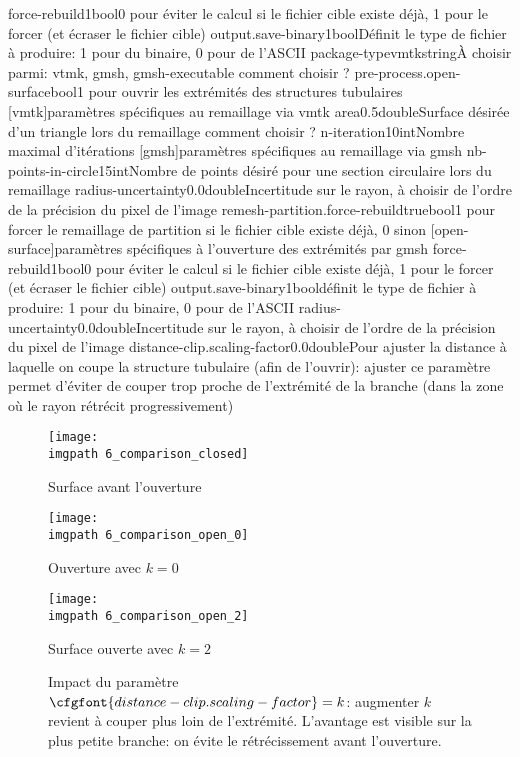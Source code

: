 \configfile
{force-rebuild}{1}{bool}{0 pour éviter le calcul si le fichier cible existe déjà, 1 pour le forcer (et écraser le fichier cible)}
{output.save-binary}{1}{bool}{Définit le type de fichier \stl à produire: 1 pour du binaire, 0 pour de l'ASCII}
{package-type}{vmtk}{string}{À choisir parmi: vtmk, gmsh, gmsh-executable \tbv comment choisir ?}
{pre-process.open-surface}{}{bool}{1 pour ouvrir les extrémités des structures tubulaires}
{[vmtk]}{paramètres spécifiques au remaillage via vmtk}{}{}
{area}{0.5}{double}{Surface désirée d'un triangle lors du remaillage \tbv comment choisir ?}
{n-iteration}{10}{int}{Nombre maximal d'itérations}
{[gmsh]}{paramètres spécifiques au remaillage via gmsh}{}{}
{nb-points-in-circle}{15}{int}{Nombre de points désiré pour une section circulaire lors du remaillage}
{radius-uncertainty}{0.0}{double}{Incertitude sur le rayon, à choisir de l'ordre de la précision du pixel de l'image}
{remesh-partition.force-rebuild}{true}{bool}{1 pour forcer le remaillage de partition si le fichier cible existe déjà, 0 sinon}
{[open-surface]}{paramètres spécifiques à l'ouverture des extrémités par gmsh}{}{} 
{force-rebuild}{1}{bool}{0 pour éviter le calcul si le fichier cible existe déjà, 1 pour le forcer (et écraser le fichier cible)}
{output.save-binary}{1}{bool}{définit le type de fichier \stl à produire: 1 pour du binaire, 0 pour de l'ASCII}
{radius-uncertainty}{0.0}{double}{Incertitude sur le rayon, à choisir de l'ordre de la précision du pixel de l'image}
{distance-clip.scaling-factor}{0.0}{double}{Pour ajuster la distance à laquelle on coupe la structure tubulaire (afin de l'ouvrir): ajuster ce paramètre permet d'éviter de couper trop proche de l'extrémité de la branche (dans la zone où le rayon rétrécit progressivement)}
\stopfile

\begin{center}
 \begin{figure}[H]
	\begin{minipage}[b]{.33\linewidth}
            	\centering
            	\texttt{[image: \\imgpath 6\_comparison\_closed]}
		\caption*{Surface avant l'ouverture}
	\end{minipage}
	\begin{minipage}[b]{0.33\linewidth}
            	\centering
            	\texttt{[image: \\imgpath 6\_comparison\_open\_0]}
		\caption*{Ouverture avec $k = 0$ }
	\end{minipage}
	\begin{minipage}[b]{0.33\linewidth}
            	\centering
            	\texttt{[image: \\imgpath 6\_comparison\_open\_2]}
		\caption*{Surface ouverte avec $k = 2$ }
	\end{minipage}
	
	\caption{Impact du paramètre $\cfgfont{distance-clip.scaling-factor} = k$:  augmenter $k$ revient à couper plus loin de l'extrémité. L'avantage est visible sur la plus petite branche: on évite le rétrécissement avant l'ouverture.}
 \end{figure}
\end{center}

